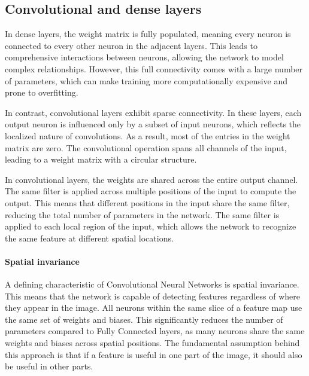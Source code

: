 \subsection{Convolutional and dense layers}
In dense layers, the weight matrix is fully populated, meaning every neuron is connected to every other neuron in the adjacent layers. 
This leads to comprehensive interactions between neurons, allowing the network to model complex relationships. 
However, this full connectivity comes with a large number of parameters, which can make training more computationally expensive and prone to overfitting.

In contrast, convolutional layers exhibit sparse connectivity.
In these layers, each output neuron is influenced only by a subset of input neurons, which reflects the localized nature of convolutions.
As a result, most of the entries in the weight matrix are zero. 
The convolutional operation spans all channels of the input, leading to a weight matrix with a circular structure.

In convolutional layers, the weights are shared across the entire output channel. 
The same filter is applied across multiple positions of the input to compute the output. 
This means that different positions in the input share the same filter, reducing the total number of parameters in the network. 
The same filter is applied to each local region of the input, which allows the network to recognize the same feature at different spatial locations.

\paragraph*{Spatial invariance}
A defining characteristic of Convolutional Neural Networks is spatial invariance. 
This means that the network is capable of detecting features regardless of where they appear in the image.
All neurons within the same slice of a feature map use the same set of weights and biases.
This significantly reduces the number of parameters compared to Fully Connected layers, as many neurons share the same weights and biases across spatial positions.
The fundamental assumption behind this approach is that if a feature is useful in one part of the image, it should also be useful in other parts. 